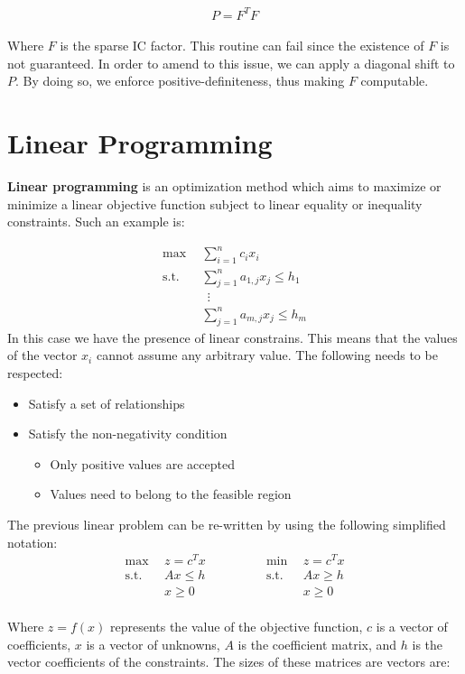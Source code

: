 \documentclass{article}
\begin{document}
\[ P = F^TF \] \\
Where $F$ is the sparse IC factor. This routine can fail since the existence of $F$ is not guaranteed. In order to amend to this issue, we can apply a diagonal shift to $P$. By doing so, we enforce positive-definiteness, thus making $F$ computable.

\section{Linear Programming}
\textbf{Linear programming} is an optimization method which aims to maximize or minimize a linear objective function subject to linear equality or inequality constraints. Such an example is:

\begin{align*}
	\max~~ & \sum_{i = 1}^n c_ix_i \\
	\text{s.t.}~~ & \sum_{j = 1}^n a_{1,j}x_j \leq h_1 \\
	~~&~~ \vdots \\
	~~& \sum_{j = 1}^n a_{m,j}x_j \leq h_m
\end{align*}
In this case we have the presence of linear constrains. This means that the values of the vector $x_i$ cannot assume any arbitrary value. The following needs to be respected:

\begin{itemize}
	\item Satisfy a set of relationships
	\item Satisfy the non-negativity condition
	\begin{itemize}
		\item Only positive values are accepted
		\item Values need to belong to the feasible region
	\end{itemize}
\end{itemize}
The previous linear problem can be re-written by using the following simplified notation:
\begin{equation*}
  \begin{split}
    \max~~ & z = c^Tx \\
	\text{s.t.}~~ & Ax \leq h \\
	~~& x \geq 0
  \end{split}
\quad\quad\quad\quad
  \begin{split}
    \min~~ & z = c^Tx \\
	\text{s.t.}~~ & Ax \geq h \\
	~~& x \geq 0
  \end{split}
\end{equation*} \\
Where $z = f(x)$ represents the value of the objective function, $c$ is a vector of coefficients, $x$ is a vector of unknowns, $A$ is the coefficient matrix, and $h$ is the vector coefficients of the constraints. The sizes of these matrices are vectors are:
\end{document}
